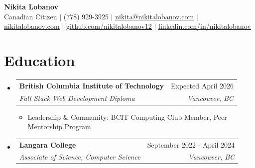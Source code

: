 \documentclass[a4paper,10pt]{article}
\makeatletter
\newcommand{\resumeItem}[1]{
  \item\small{
    {#1 \vspace{-1pt}}
  }
}
\newcommand{\resumeSubheading}[4]{
  \vspace{1pt}\item
    \begin{tabular*}{0.97\textwidth}[t]{l@{\extracolsep{\fill}}r}
      \textbf{#1} & #2 \\
      \textit{\small#3} & \textit{\small #4} \\
    \end{tabular*}\vspace{-6pt}
}
\newcommand{\resumeItemListStart}{\begin{itemize}[itemsep=2pt]}
\newcommand{\resumeItemListEnd}{\end{itemize}\vspace{-2pt}}
\makeatother
\begin{document}
\begin{center}
    \textbf{\Huge Nikita Lobanov} \\ \vspace{4pt}
    \footnotesize Canadian Citizen $|$ (778) 929-3925 $|$ \href{mailto:nikita@nikitalobanov.com}{\underline{nikita@nikitalobanov.com}} $|$ 
    \href{https://nikitalobanov.com }{\underline{nikitalobanov.com}} $|$ 
    \href{https://github.com/nikitalobanov12 }{\underline{github.com/nikitalobanov12}} $|$ 
    \href{https://linkedin.com/in/nikitalobanov }{\underline{linkedin.com/in/nikitalobanov}}
\end{center}

\section{Education}
  \begin{itemize}[leftmargin=0.15in, label={}]
    \resumeSubheading
      {British Columbia Institute of Technology}{Expected April 2026}
      {Full Stack Web Development Diploma}{Vancouver, BC}
      \resumeItemListStart
        \resumeItem{Leadership \& Community: BCIT Computing Club Member, Peer Mentorship Program}
      \resumeItemListEnd
      \resumeSubheading
      {Langara College}{September 2022 - April 2024}
      {Associate of Science, Computer Science}{Vancouver, BC}
  \end{itemize}
\end{document}
